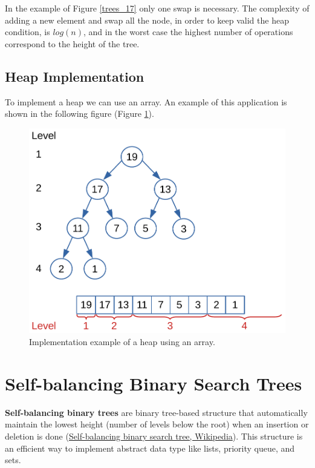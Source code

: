 In the example of Figure \ref{trees_17} only one swap is necessary. The complexity of adding a new element and swap all the node, in order to keep valid the heap condition, is \(log(n)\), and in the worst case the highest number of operations correspond to the height of the tree.

\subsection{Heap Implementation}
To implement a heap we can use an array. An example of this application is shown in the following figure (Figure \ref{trees_18}).

\begin{figure}[H]
	\begin{center}
		\includegraphics[scale=.6]{chapters/trees/images/trees_18.pdf}
		\caption[Implementation example of a heap using an array.]{Implementation example of a heap using an array.}
		\label{trees_18}
	\end{center}
\end{figure}

\section{Self-balancing Binary Search Trees}
\textbf{Self-balancing binary trees} are binary tree-based structure that automatically maintain the lowest height (number of levels below the root) when an insertion or deletion is done \cite{wikiselfbalancing} (\href{https://en.wikipedia.org/wiki/Self-balancing_binary_search_tree}{Self-balancing binary search tree, Wikipedia}). This structure is an efficient way to implement abstract data type like lists, priority queue, and sets.


